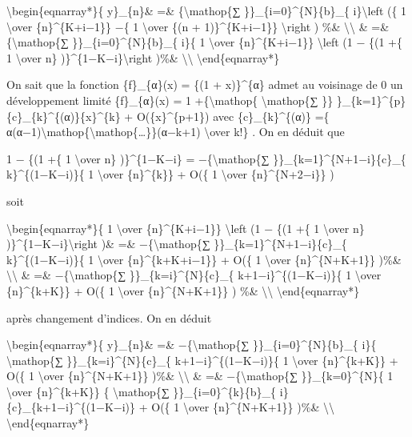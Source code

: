 \documentclass[]{article}
\begin{document}
\textbackslash{}begin\{eqnarray*\}\{ y\}\_\{n\}\& =\&
\{\textbackslash{}mathop\{∑ \}\}\_\{i=0\}\^{}\{N\}\{b\}\_\{
i\}\textbackslash{}left (\{ 1 \textbackslash{}over \{n\}\^{}\{K+i−1\}\}
−\{ 1 \textbackslash{}over \{(n + 1)\}\^{}\{K+i−1\}\}
\textbackslash{}right ) \%\& \textbackslash{}\textbackslash{} \& =\&
\{\textbackslash{}mathop\{∑ \}\}\_\{i=0\}\^{}\{N\}\{b\}\_\{ i\}\{ 1
\textbackslash{}over \{n\}\^{}\{K+i−1\}\} \textbackslash{}left (1 − \{(1
+\{ 1 \textbackslash{}over n\} )\}\^{}\{1−K−i\}\textbackslash{}right
)\%\& \textbackslash{}\textbackslash{} \textbackslash{}end\{eqnarray*\}

On sait que la fonction \{f\}\_\{α\}(x) = \{(1 + x)\}\^{}\{α\} admet au
voisinage de 0 un développement limité \{f\}\_\{α\}(x) = 1
+\{\textbackslash{}mathop\{ \textbackslash{}mathop\{∑ \}\}
\}\_\{k=1\}\^{}\{p\}\{c\}\_\{k\}\^{}\{(α)\}\{x\}\^{}\{k\} +
O(\{x\}\^{}\{p+1\}) avec \{c\}\_\{k\}\^{}\{(α)\} =\{
α(α−1)\textbackslash{}mathop\{\textbackslash{}mathop\{\ldots{}\}\}(α−k+1)
\textbackslash{}over k!\} . On en déduit que

1 − \{(1 +\{ 1 \textbackslash{}over n\} )\}\^{}\{1−K−i\} =
−\{\textbackslash{}mathop\{∑ \}\}\_\{k=1\}\^{}\{N+1−i\}\{c\}\_\{
k\}\^{}\{(1−K−i)\}\{ 1 \textbackslash{}over \{n\}\^{}\{k\}\} + O(\{ 1
\textbackslash{}over \{n\}\^{}\{N+2−i\}\} )

soit

\textbackslash{}begin\{eqnarray*\}\{ 1 \textbackslash{}over
\{n\}\^{}\{K+i−1\}\} \textbackslash{}left (1 − \{(1 +\{ 1
\textbackslash{}over n\} )\}\^{}\{1−K−i\}\textbackslash{}right )\& =\&
−\{\textbackslash{}mathop\{∑ \}\}\_\{k=1\}\^{}\{N+1−i\}\{c\}\_\{
k\}\^{}\{(1−K−i)\}\{ 1 \textbackslash{}over \{n\}\^{}\{k+K+i−1\}\} +
O(\{ 1 \textbackslash{}over \{n\}\^{}\{N+K+1\}\} )\%\&
\textbackslash{}\textbackslash{} \& =\& −\{\textbackslash{}mathop\{∑
\}\}\_\{k=i\}\^{}\{N\}\{c\}\_\{ k+1−i\}\^{}\{(1−K−i)\}\{ 1
\textbackslash{}over \{n\}\^{}\{k+K\}\} + O(\{ 1 \textbackslash{}over
\{n\}\^{}\{N+K+1\}\} ) \%\& \textbackslash{}\textbackslash{}
\textbackslash{}end\{eqnarray*\}

après changement d'indices. On en déduit

\textbackslash{}begin\{eqnarray*\}\{ y\}\_\{n\}\& =\&
−\{\textbackslash{}mathop\{∑ \}\}\_\{i=0\}\^{}\{N\}\{b\}\_\{ i\}\{
\textbackslash{}mathop\{∑ \}\}\_\{k=i\}\^{}\{N\}\{c\}\_\{
k+1−i\}\^{}\{(1−K−i)\}\{ 1 \textbackslash{}over \{n\}\^{}\{k+K\}\} +
O(\{ 1 \textbackslash{}over \{n\}\^{}\{N+K+1\}\} )\%\&
\textbackslash{}\textbackslash{} \& =\& −\{\textbackslash{}mathop\{∑
\}\}\_\{k=0\}\^{}\{N\}\{ 1 \textbackslash{}over \{n\}\^{}\{k+K\}\} \{
\textbackslash{}mathop\{∑ \}\}\_\{i=0\}\^{}\{k\}\{b\}\_\{
i\}\{c\}\_\{k+1−i\}\^{}\{(1−K−i)\} + O(\{ 1 \textbackslash{}over
\{n\}\^{}\{N+K+1\}\} )\%\& \textbackslash{}\textbackslash{}
\textbackslash{}end\{eqnarray*\}
\end{document}
